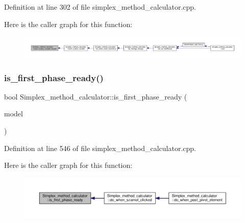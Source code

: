 Definition at line 302 of file simplex\+\_\+method\+\_\+calculator.\+cpp.

Here is the caller graph for this function\+:\nopagebreak
\begin{figure}[H]
\begin{center}
\leavevmode
\includegraphics[width=350pt]{classSimplex__method__calculator_a4e959dd505b0924ac592326c21c7d0cf_icgraph}
\end{center}
\end{figure}
\mbox{\label{classSimplex__method__calculator_a7e8682e4e121b5b171b34cd0b127fb3e}} 
\subsubsection{\texorpdfstring{is\+\_\+first\+\_\+phase\+\_\+ready()}{is\_first\_phase\_ready()}}
{\footnotesize\ttfamily bool Simplex\+\_\+method\+\_\+calculator\+::is\+\_\+first\+\_\+phase\+\_\+ready (\begin{DoxyParamCaption}\item[{Q\+Standard\+Item\+Model $\ast$}]{model }\end{DoxyParamCaption})\hspace{0.3cm}{\ttfamily [private]}}



Definition at line 546 of file simplex\+\_\+method\+\_\+calculator.\+cpp.

Here is the caller graph for this function\+:\nopagebreak
\begin{figure}[H]
\begin{center}
\leavevmode
\includegraphics[width=350pt]{classSimplex__method__calculator_a7e8682e4e121b5b171b34cd0b127fb3e_icgraph}
\end{center}
\end{figure}
\mbox{\label{classSimplex__method__calculator_ada7c9fda10b113b93cc80d77c57727da}} 
